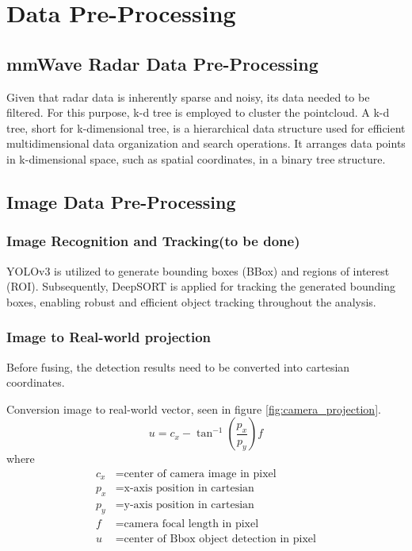 \section{Data Pre-Processing}\label{sec:2-preprocessing}
\subsection{mmWave Radar Data Pre-Processing}\label{sec:2-kd_tree}
Given that radar data is inherently sparse and noisy, its data needed to be filtered.
For this purpose, k-d tree is employed to cluster the pointcloud.
A k-d tree, short for k-dimensional tree, is a hierarchical data structure used for efficient multidimensional data organization and search operations. 
It arranges data points in k-dimensional space, such as spatial coordinates, in a binary tree structure. 

\subsection{Image Data Pre-Processing}\label{sec:2-img_recognition}
\subsubsection{Image Recognition and Tracking\small(to be done)}
YOLOv3 is utilized to generate bounding boxes (BBox) and regions of interest (ROI)\cite{redmon2018yolov3}.
Subsequently, DeepSORT is applied for tracking the generated bounding boxes, 
enabling robust and efficient object tracking throughout the analysis\cite{Wojke2017simple}.

\subsubsection{Image to Real-world projection}
Before fusing, the detection results need to be converted into cartesian coordinates.

Conversion image to real-world vector, seen in figure \ref{fig:camera_projection}.
\begin{equation}\label{equ:img2cart}
u=c_x-\tan^{-1}(\frac{p_x}{p_y})f
\end{equation}
where
\begin{align*}
    c_x &=\text{center of camera image in pixel}\\
    p_x &=\text{x-axis position in cartesian}\\
    p_y &=\text{y-axis position in cartesian}\\
    f &=\text{camera focal length in pixel}\\
    u &=\text{center of Bbox object detection in pixel}
\end{align*}

